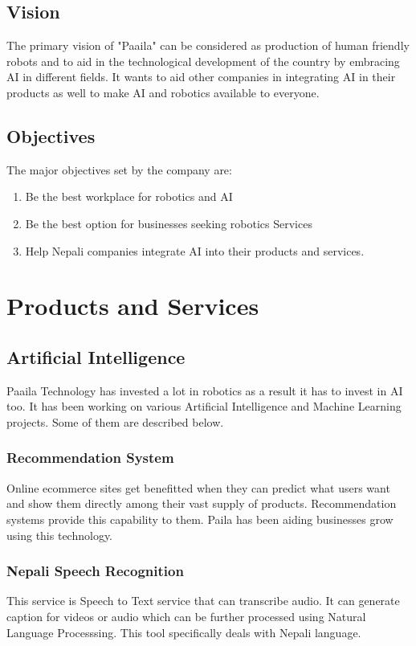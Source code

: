 \documentclass[12pt,a4paper]{scrreprt}
\begin{document}
\section{Vision}
The primary vision of "Paaila" can be considered as production of human friendly robots and to aid in the technological development of the country by embracing AI in different fields. It wants to aid other companies in integrating AI in their products as well to make AI and robotics available to everyone.

\section{Objectives}
The major objectives set by the company are:
\begin{enumerate}
  \item Be the best workplace for robotics and AI
  \item Be the best option for businesses seeking robotics Services
  \item Help Nepali companies integrate AI into their products and services.
\end{enumerate}

\chapter{Products and Services}

\section{Artificial Intelligence}
  Paaila Technology has invested a lot in robotics as a result it has to invest in AI too. 
  It has been working on various Artificial Intelligence and Machine Learning projects. Some of them
  are described below.

  \subsection{Recommendation System}
  Online ecommerce sites get benefitted when they can predict what users want and show them directly among their vast
  supply of products. Recommendation systems provide this capability to them. Paila has been aiding businesses grow using this technology.

  \subsection{Nepali Speech Recognition}
  This service is Speech to Text service that can transcribe audio. It can generate caption for videos
  or audio which can be further processed using Natural Language Processsing. This tool specifically deals with
  Nepali language.
  
\end{document}
